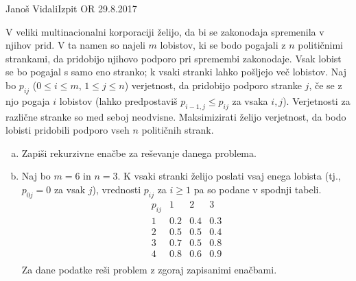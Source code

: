 \begin{naloga}{Janoš Vidali}{Izpit OR 29.8.2017}
\begin{vprasanje}
V veliki multinacionalni korporaciji želijo,
da bi se zakonodaja spremenila v njihov prid.
V ta namen so najeli $m$ lobistov,
ki se bodo pogajali z $n$ političnimi strankami,
da pridobijo njihovo podporo pri spremembi zakonodaje.
Vsak lobist se bo pogajal s samo eno stranko;
k vsaki stranki lahko pošljejo več lobistov.
Naj bo $p_{ij}$ ($0 \le i \le m$, $1 \le j \le n$) verjetnost,
da pridobijo podporo stranke $j$,
če se z njo pogaja $i$ lobistov
(lahko predpostaviš $p_{i-1,j} \le p_{ij}$ za vsaka $i, j$).
Verjetnosti za različne stranke so med seboj neodvisne.
Maksimizirati želijo verjetnost,
da bodo lobisti pridobili podporo vseh $n$ političnih strank.

\begin{enumerate}[(a)]
\item Zapiši rekurzivne enačbe za reševanje danega problema.
\item Naj bo $m = 6$ in $n = 3$.
K vsaki stranki želijo poslati vsaj enega lobista
(tj., $p_{0j} = 0$ za vsak $j$),
vrednosti $p_{ij}$ za $i \ge 1$ pa so podane v spodnji tabeli.
$$
\begin{array}{c|ccc}
p_{ij} & 1 & 2 & 3 \\ \hline
1 & 0.2 & 0.4 & 0.3 \\
2 & 0.5 & 0.5 & 0.4 \\
3 & 0.7 & 0.5 & 0.8 \\
4 & 0.8 & 0.6 & 0.9 \\
\end{array}
$$
Za dane podatke reši problem z zgoraj zapisanimi enačbami.
\end{enumerate}
\end{vprasanje}
\begin{odgovor}
\end{odgovor}
\end{naloga}


